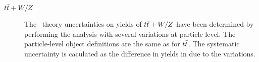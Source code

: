 \begin{description}


\item[\boldmath $t\bar{t}+W/Z$] The \ttV\ theory uncertainties on yields of $t\bar{t}+W/Z$ have been determined by performing the analysis with several variations at particle level. The particle-level object definitions are the same as for $t\bar{t}$. The systematic uncertainty is caculated as the difference in yields in due to the variations. %


\end{description}
